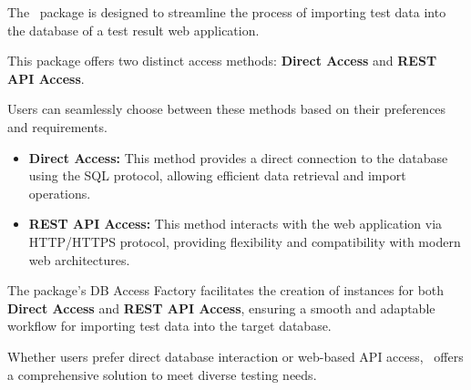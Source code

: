 



The \pkg\ package is designed to streamline the process of importing test data 
into the database of a test result web application. 

This package offers two distinct access methods: \textbf{Direct Access} and 
\textbf{REST API Access}. 

Users can seamlessly choose between these methods based on their preferences and 
requirements.

\begin{itemize}
    \item \textbf{Direct Access:} This method provides a direct connection to 
          the database using the SQL protocol, allowing efficient data retrieval 
          and import operations.
    \item \textbf{REST API Access:} This method interacts with the web 
          application via HTTP/HTTPS protocol, providing flexibility and 
          compatibility with modern web architectures.
\end{itemize}

The package's DB Access Factory facilitates the creation of instances for both 
\textbf{Direct Access} and \textbf{REST API Access}, ensuring a smooth and 
adaptable workflow for importing test data into the target database. 

Whether users prefer direct database interaction or web-based API access, 
\pkg\ offers a comprehensive solution to meet diverse testing needs.